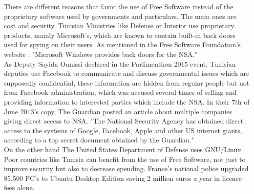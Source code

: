
\newpage
\vspace{3cm}
 
\NewsItem{\textcolor[rgb]{0.55,0,0}{\huge Free Software in Tunisian Government}}


\begin{multicols}{2}

There are different reasons that favor the use of Free Software instead of the proprietary software used by governments and particulars. The main ones are cost and security.
Tunisian Ministries like Defense or Interior use proprietary products, mainly Microsoft's, which are known to contain built-in back doors used for spying on their users. As mentioned in the Free Software Foundation's website : "Microsoft Windows provides back doors for the NSA."\\

As Deputy Sayida Ounissi declared in the Parlimenthon 2015 event, Tunisian deputies use Facebook to communicate and discuss governmental issues which are supposedly confidential, these information are hidden from regular people but not from Facebook administration, which was accused several times of selling and providing information to interested parties which include the NSA. In their 7th of June 2013's copy, The Guardian posted an article about multiple companies giving direct access to NSA. "The National Security Agency has obtained direct access to the systems of Google, Facebook, Apple and other US internet giants, according to a top secret document obtained by the Guardian."\\

On the other hand The United States Department of Defense uses GNU/Linux.\\

Poor countries like Tunisia can benefit from the use of Free Software, not just to improve security but also to decrease spending. France's national police upgraded 85,500 PC's to Ubuntu Desktop Edition saving 2 million euros a year in licence fees alone.


\end{multicols}

